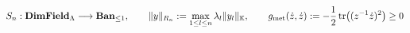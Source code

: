 \documentclass[preview]{standalone}
\begin{document}
\begin{align*}
\special{dvisvgm:raw <g id='unique000'>}S_n : \mathbf{DimField}_\Lambda \longrightarrow \mathbf{Ban}_{\le 1}, \qquad \|y\|_{R_n} := \max_{1\le l\le n} \lambda_l\|y_l\|_{\mathbb{K}}, \qquad g_{\text{met}}(\dot{z},\dot{z}) := -\frac{1}{2}\operatorname{tr}\!\left((z^{-1}\dot{z})^2\right) \ge 0\special{dvisvgm:raw </g>}
\end{align*}
\end{document}
